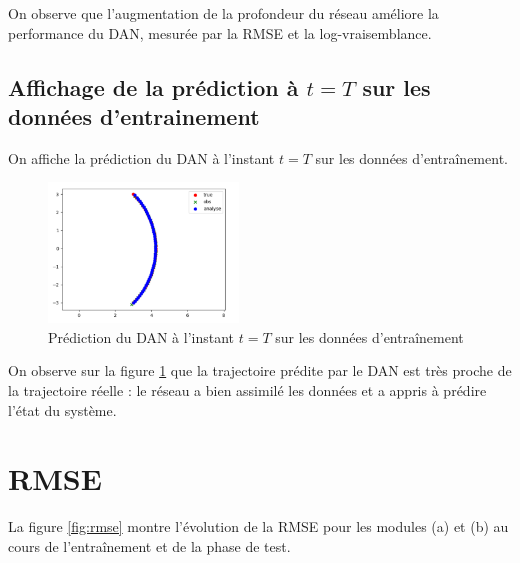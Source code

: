 \documentclass[12pt,a4paper]{article}
\begin{document}
On observe que l'augmentation de la profondeur du réseau améliore la performance du DAN, mesurée par la RMSE et la log-vraisemblance.


\subsection{Affichage de la prédiction à \texorpdfstring{$t=T$}{t=T} sur les données d’entrainement}

On affiche la prédiction du DAN à l'instant $t=T$ sur les données d'entraînement. \\

\begin{figure}[H]
    \centering
    \includegraphics[width=0.45\textwidth]{src/lin2d_pred.png}
    \caption{Prédiction du DAN à l'instant $t=T$ sur les données d'entraînement}
    \label{fig:pred}
\end{figure}

On observe sur la figure \ref{fig:pred} que la trajectoire prédite par le DAN est très proche de la trajectoire réelle : le réseau a bien assimilé les données et a appris à prédire l'état du système. \\

\section{RMSE}

La figure \ref{fig:rmse} montre l'évolution de la RMSE pour les modules (a) et (b) au cours de l'entraînement et de la phase de test. \\
\end{document}
